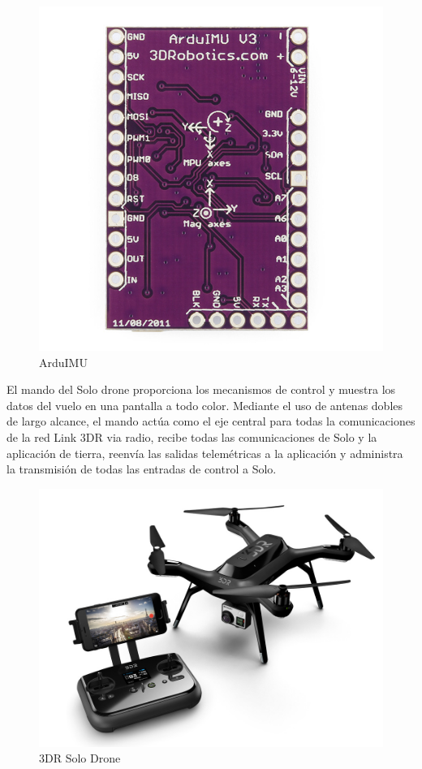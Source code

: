 \begin{figure}[H]
  \centering
  \includegraphics[scale=1]{imagenes/arduimutrasera.jpg}
  \caption{ArduIMU}
  \label{fig:arduimu}
\end{figure}

El mando del Solo drone proporciona los mecanismos de control y muestra los datos del vuelo en una pantalla a todo color. Mediante el uso de antenas dobles de largo alcance, el mando actúa como el eje central para todas la comunicaciones de la red Link 3DR via radio, recibe todas las comunicaciones de Solo y la aplicación de tierra, reenvía las salidas telemétricas a la aplicación y administra la transmisión de todas las entradas de control a Solo.

\begin{figure}[H]
  \centering
  \includegraphics[scale=1]{imagenes/3drSoloDron.jpg}
  \caption{3DR Solo Drone}
  \label{fig:3drsolodrone}
\end{figure}

